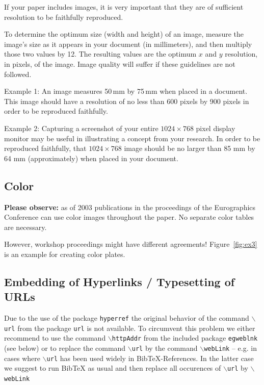 \documentclass{egpubl-eurovis-short}
\begin{document}
If your paper includes images, it is very important that they are of
sufficient resolution to be faithfully reproduced.

To determine the optimum size (width and height) of an image, measure
the image's size as it appears in your document (in millimeters), and
then multiply those two values by 12. The resulting values are the
optimum $x$ and $y$ resolution, in pixels, of the image. Image quality
will suffer if these guidelines are not followed.

Example 1: 
%
An image measures 50\,mm by 75\,mm when placed in a document. This
image should have a resolution of no less than 600 pixels by 900
pixels in order to be reproduced faithfully.

Example 2: 
%
Capturing a screenshot of your entire $1024 \times 768$ pixel display
monitor may be useful in illustrating a concept from your research. In
order to be reproduced faithfully, that $1024 \times 768$ image should
be no larger than 85 mm by 64 mm (approximately) when placed in your
document.


\subsection{Color}

\textbf{Please observe:} as of 2003 publications in the proceedings of the
Eurographics Conference can use color images throughout the paper. No
separate color tables are necessary.

However, workshop proceedings might have different agreements! 
Figure~\ref{fig:ex3} is an example for creating color plates.

\subsection{Embedding of Hyperlinks / Typesetting of URLs}

Due to the use of the package \texttt{hyperref} the original behavior
of the command $\backslash$\texttt{url} from the package \texttt{url}
is not available. To circumvent this problem we either recommend to
use the command $\backslash$\texttt{httpAddr} from the 
included package \texttt{egweblnk} (see below) or to replace the
command $\backslash$\texttt{url} by the command $\backslash$\texttt{webLink} 
-- e.g. in cases where $\backslash$\texttt{url} has been used
widely in BibTeX-References. In the latter case we suggest to run
BibTeX as usual and then replace all occurences of $\backslash$\texttt{url}  by
$\backslash$\texttt{webLink}
\end{document}
